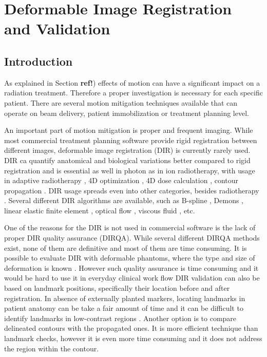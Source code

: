 \documentclass[type=dr, dr=rernat, accentcolor=tud7b,colorbacktitle, bigchapter, openright, twoside, 12pt ]{tudthesis}
\begin{document}
\chapter{Deformable Image Registration and Validation}
\label{chapter:vmm}
\minitoc

\section{Introduction}

As explained in Section \textbf{ref!}) effects of motion can have a significant impact on a radiation treatment. Therefore a proper investigation is necessary for each specific patient. There are several motion mitigation techniques available that can operate on beam delivery, patient immobilization or treatment planning level.

An important part of motion mitigation is proper and frequent imaging. While most commercial treatment planning software provide rigid registration between different images, deformable image registration (DIR) is currently rarely used. 
DIR ca quantify anatomical and biological variations better compared to rigid registration \cite{Sarrut2006} and is essential as well in photon as in ion radiotherapy, with usage in adaptive radiotherapy \cite{Yan1997,Yan2010}, 
4D optimization \cite{Trofimov2005}, 4D dose calculation \cite{Flampouri2006}, contour propagation \cite{Lu2006b}. DIR usage spreads even into other categories, besides radiotherapy \cite{Cleary2010, Herrell2012, Nithiananthan2011, Naini2010}.
Several different DIR algorithms are available, such as B-spline \cite{Rueckert1999}, Demons \cite{Thirion1998}, linear elastic finite element \cite{Venugopal2005}, optical flow \cite{Zhong2007}, viscous fluid \cite{Christensen1996}, etc.
	
One of the reasons for the DIR is not used in commercial software is the lack of proper DIR quality assurance (DIRQA). While several different DIRQA methods exist, none of them are definitive and most of them are time consuming. 
It is possible to evaluate DIR with deformable phantoms, where the type and size of deformation is known \cite{Kashani2007, Kirby2011}. However such quality assurance is time consuming and it would be hard to use it 
in everyday clinical work flow DIR validation can also be based on landmark positions, specifically their location before and after registration. In absence of externally planted markers, locating landmarks in patient 
anatomy can be take a fair amount of time and it can be difficult to identify landmarks in low-contrast regions \cite{Varadhan2013}. Another option is to compare delineated contours with the propagated ones. 
It is more efficient technique than landmark checks, however it is even more time consuming and it does not address the region within the contour.
\end{document}
